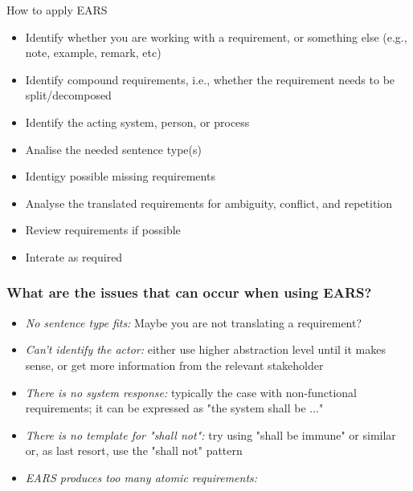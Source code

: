 \documentclass[aspectratio=169]{beamer}
\begin{document}
\begin{slide}{How to apply EARS}
  \begin{itemize}
  \item Identify whether you are working with a requirement, or something else (e.g., note, example, remark, etc)
  \item Identify compound requirements, i.e., whether the requirement needs to be split/decomposed 
  \item Identify the acting system, person, or process
  \item Analise the needed sentence type(s)
  \item Identigy possible missing requirements
  \item Analyse the translated requirements for ambiguity, conflict, and repetition
  \item Review requirements if possible
  \item Interate as required
  \end{itemize}
\end{slide}
%
%
\begin{frame}
  \frametitle{What are the issues that can occur when using EARS?}
  \begin{itemize}
  \item {\it No sentence type fits:} Maybe you are not translating a requirement?
  \item {\it Can't identify the actor:} either use higher abstraction level until it makes sense, or get more information from the relevant stakeholder
  \item {\it There is no system response:}  typically the case with non-functional requirements; it can be expressed as "the system shall be ..."
  \item {\it There is no template for "shall not":} try using "shall be immune" or similar or, as last resort, use the "shall not" pattern
  \item {\it EARS produces too many atomic requirements:} 
  \end{itemize}
  
\end{frame}

\end{document}
